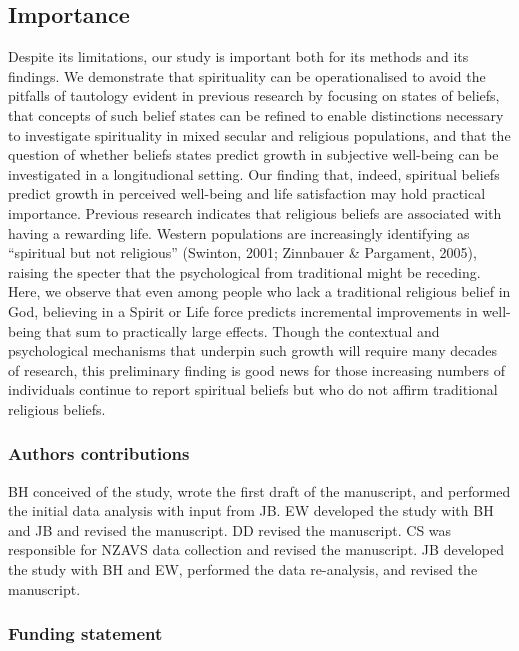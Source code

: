 \documentclass[
  english,
  man]{apa6}
\begin{document}
\hypertarget{importance}{%
\subsection{Importance}\label{importance}}

Despite its limitations, our study is important both for its methods and its findings. We demonstrate that spirituality can be operationalised to avoid the pitfalls of tautology evident in previous research by focusing on states of beliefs, that concepts of such belief states can be refined to enable distinctions necessary to investigate spirituality in mixed secular and religious populations, and that the question of whether beliefs states predict growth in subjective well-being can be investigated in a longitudional setting. Our finding that, indeed, spiritual beliefs predict growth in perceived well-being and life satisfaction may hold practical importance. Previous research indicates that religious beliefs are associated with having a rewarding life. Western populations are increasingly identifying as \enquote{spiritual but not religious} (Swinton, 2001; Zinnbauer \& Pargament, 2005), raising the specter that the psychological from traditional might be receding. Here, we observe that even among people who lack a traditional religious belief in God, believing in a Spirit or Life force predicts incremental improvements in well-being that sum to practically large effects. Though the contextual and psychological mechanisms that underpin such growth will require many decades of research, this preliminary finding is good news for those increasing numbers of individuals continue to report spiritual beliefs but who do not affirm traditional religious beliefs.

\hypertarget{authors-contributions}{%
\subsubsection{Authors contributions}\label{authors-contributions}}

BH conceived of the study, wrote the first draft of the manuscript, and performed the initial data analysis with input from JB. EW developed the study with BH and JB and revised the manuscript. DD revised the manuscript. CS was responsible for NZAVS data collection and revised the manuscript. JB developed the study with BH and EW, performed the data re-analysis, and revised the manuscript.

\hypertarget{funding-statement}{%
\subsubsection{Funding statement}\label{funding-statement}}
\end{document}
